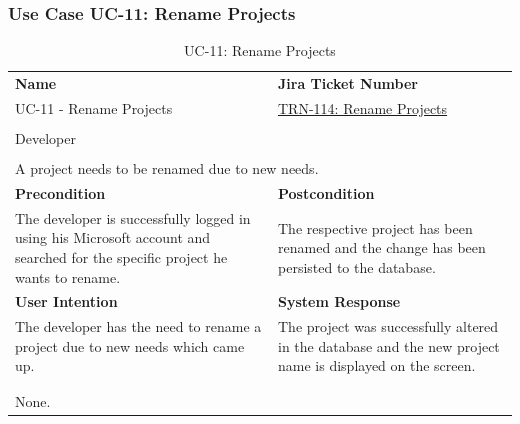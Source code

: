 \subsubsection{Use Case UC-11: Rename Projects}\label{subsubsec:use-case-uc-11:-rename-project}

\begin{table}[H]
    \centering
    \begin{tabular}{|p{}|p{}|}

        \hline
        \rowcolor{gray!50}\textbf{Name} & \textbf{Jira Ticket Number} \\
        UC-11 - Rename Projects &
        \href{https://fh-burgenland.atlassian.net/browse/TRN-114}{TRN-114: Rename Projects} \\ \hline

        \rowcolor{gray!50}\multicolumn{2}{|l|}{\textbf{User Role}} \\
        \multicolumn{2}{|l|}{Developer} \\ \hline

        \rowcolor{gray!50}\multicolumn{2}{|l|}{\textbf{Purpose}} \\
        \multicolumn{2}{|l|}{A project needs to be renamed due to new needs.} \\ \hline

        \rowcolor{gray!50}\textbf{Precondition} & \textbf{Postcondition} \\
        The developer is successfully logged in using his Microsoft account and searched for the specific project he wants to rename.
        &
        The respective project has been renamed and the change has been persisted to the database. \\ \hline

        \rowcolor{gray!50}\textbf{User Intention} & \textbf{System Response} \\
        The developer has the need to rename a project due to new needs which came up.
        &
        The project was successfully altered in the database and the new project name is displayed on the screen. \\ \hline

        \multicolumn{2}{|c|}{} \\ \hline

        \rowcolor{gray!50}\multicolumn{2}{|l|}{\textbf{Remarks}} \\
        \multicolumn{2}{|l|}{None.} \\ \hline
    \end{tabular}
    \caption{UC-11: Rename Projects}
    \label{tab:uc-11_rename_projects}
\end{table}


